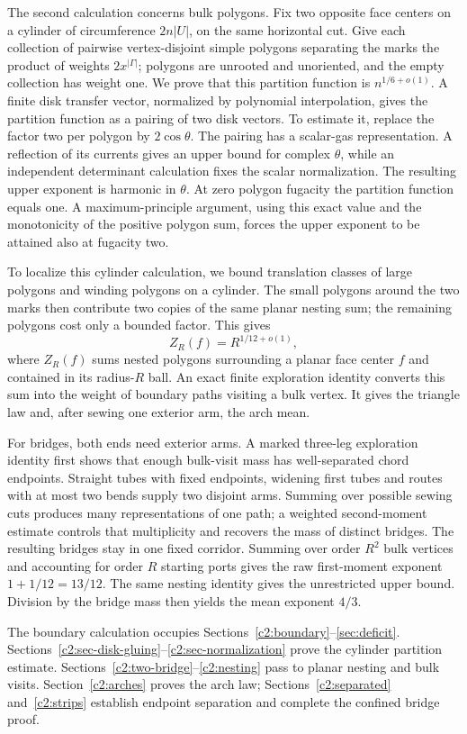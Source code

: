 The second calculation concerns bulk polygons. Fix two opposite face
centers on a cylinder of circumference $2n|U|$, on the same horizontal cut.
Give each collection of pairwise vertex-disjoint simple polygons
separating the marks the product of weights $2x^{|\Gamma|}$; polygons
are unrooted and unoriented, and the empty collection has weight one.
We prove that this partition function is $n^{1/6+o(1)}$.
A finite disk transfer vector, normalized by polynomial interpolation,
gives the partition function as a pairing of two disk vectors.
To estimate it, replace the factor two per polygon by $2\cos\theta$.
The pairing has a scalar-gas representation. A reflection of its currents
gives an upper bound for complex $\theta$, while an independent determinant
calculation fixes the scalar normalization. The resulting upper exponent
is harmonic in $\theta$. At zero polygon fugacity the partition function
equals one. A maximum-principle argument, using this exact value and the
monotonicity of the positive polygon sum, forces the upper exponent to be
attained also at fugacity two.

To localize this cylinder calculation, we bound translation classes of
large polygons and winding polygons on a cylinder. The small polygons
around the two marks then contribute two copies of the same planar
nesting sum; the remaining polygons cost only a bounded factor. This gives
\[
 Z_R(f)=R^{1/12+o(1)},
\]
where $Z_R(f)$ sums nested polygons surrounding a planar face center $f$
and contained in its radius-$R$ ball. An exact finite exploration identity
converts this sum into the weight of boundary paths visiting a bulk vertex.
It gives the triangle law and, after sewing one exterior arm, the arch mean.

For bridges, both ends need exterior arms. A marked three-leg exploration
identity first shows that enough bulk-visit mass has well-separated chord
endpoints. Straight tubes with fixed endpoints, widening first tubes and
routes with at most two bends supply two disjoint arms. Summing over
possible sewing cuts produces many representations of one path; a weighted
second-moment estimate controls that multiplicity and recovers the mass of
distinct bridges. The resulting bridges stay in one fixed corridor.
Summing over order $R^2$ bulk vertices and accounting for order $R$
starting ports gives the raw first-moment exponent $1+1/12=13/12$.
The same nesting identity gives the unrestricted upper bound. Division
by the bridge mass then yields the mean exponent $4/3$.

The boundary calculation occupies Sections~\ref{c2:boundary}--\ref{sec:deficit}.
Sections~\ref{c2:sec-disk-gluing}--\ref{c2:sec-normalization}
prove the cylinder partition estimate.
Sections~\ref{c2:two-bridge}--\ref{c2:nesting} pass to planar nesting and
bulk visits. Section~\ref{c2:arches} proves the arch law;
Sections~\ref{c2:separated} and~\ref{c2:strips} establish endpoint separation
and complete the confined bridge proof.

